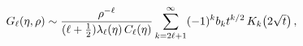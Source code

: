 \[\mathop{G_{\ell}\/}\nolimits\!\left(\eta,\rho\right)\sim\frac{\rho^{-\ell}}{(%
\ell+\frac{1}{2})\lambda_{\ell}(\eta)\mathop{C_{\ell}\/}\nolimits\!\left(\eta%
\right)}\*\sum_{k=2\ell+1}^{\infty}(-1)^{k}b_{k}t^{k/2}\mathop{K_{k}\/}%
\nolimits\!\left(\textstyle 2\sqrt{t}\right),\]